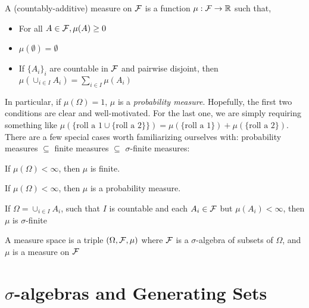 \begin{definition}[Measure] \label{def:measure} A (countably-additive) measure on $\mathcal F$ is a function $\mu : \mathcal F \to \mathbb R$ such that, 
    \begin{itemize}
        \item For all $A \in \mathcal F, \mu(A) \geq 0$
        \item $\mu(\emptyset) = \emptyset$
        \item If $\{A_i\}_i$ are countable in $\mathcal F$ and pairwise disjoint, then $\mu(\cup_{i \in I}A_i ) = \sum_{i \in I}\mu(A_i)$
    \end{itemize}
\end{definition}

In particular, if $\mu(\Omega) = 1$, $\mu$ is a \emph{probability measure}.
Hopefully, the first two conditions are clear and well-motivated. For the last one, we are simply requiring something like 
$\mu(\{\text{roll a 1} \cup \{\text{roll a 2}\}\}) = \mu(\{\text{roll a 1}\}) + \mu(\{\text{roll a 2}\})$. There are a few 
special cases worth familiarizing ourselves with: probability measures $\subseteq$ finite measures $\subseteq$ $\sigma$-finite measures: 

\begin{definition}\label{def:finite measure}
    If $\mu(\Omega) < \infty$, then $\mu$ is finite.
\end{definition}

\begin{definition}\label{def:probability measure}
    If $\mu(\Omega) < \infty$, then $\mu$ is a probability measure.
\end{definition}

\begin{definition}\label{def:sigma finite}
    If $\Omega = \cup_{i \in I}A_i$, such that $I$ is countable and each $A_i \in \mathcal F$ but 
    $\mu(A_i) < \infty$, then $\mu$ is $\sigma$-finite
\end{definition}

\begin{definition} \label{def:measure space} A measure space is  a triple $(\Omega, \mathcal F, \mu)$ where 
    $\mathcal F$ is a $\sigma$-algebra of subsets of $\Omega$, and $\mu$ is a measure on $\mathcal F$
\end{definition}

\section{$\sigma$-algebras and Generating Sets}

